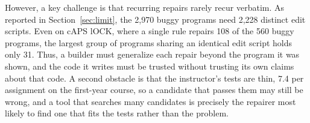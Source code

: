 \documentclass[acmsmall,screen,review,anonymous,nonacm]{acmart}
\begin{document}
However, a key challenge is that recurring repairs rarely recur verbatim. As reported in Section~\ref{sec:limit}, the 2{,}970 buggy programs need 2{,}228 distinct edit scripts. Even on cAPS lOCK, where a single rule repairs 108 of the 560 buggy programs, the largest group of programs sharing an identical edit script holds only 31. Thus, a builder must generalize each repair beyond the program it was shown, and the code it writes must be trusted without trusting its own claims about that code. A second obstacle is that the instructor's tests are thin, 7.4 per assignment on the first-year course, so a candidate that passes them may still be wrong, and a tool that searches many candidates is precisely the repairer most likely to find one that fits the tests rather than the problem.
\end{document}
